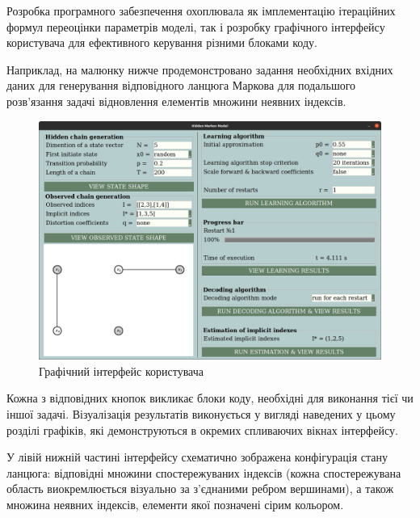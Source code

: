 \label{appendix: A}

Розробка програмного забезпечення охоплювала як імплементацію ітераційних формул переоцінки параметрів моделі, так і розробку графічного інтерфейсу користувача для ефективного керування різними блоками коду. 

Наприклад, на малюнку нижче продемонстровано задання необхідних вхідних даних для генерування відповідного ланцюга Маркова для подальшого розв'язання задачі відновлення елементів множини неявних індексів.

\begin{figure}[H]\centering
    \includegraphics[width=1\linewidth]{Images/GUI.png}
    \caption{Графічний інтерфейс користувача}
    \label{pic: GUI}
\end{figure}

Кожна з відповідних кнопок викликає блоки коду, необхідні для виконання тієї чи іншої задачі. Візуалізація результатів виконується у вигляді наведених у цьому розділі графіків, які демонструються в окремих спливаючих вікнах інтерфейсу.

У лівій нижній частині інтерфейсу схематично зображена конфігурація стану ланцюга: відповідні множини спостережуваних індексів (кожна спостережувана область виокремлюється візуально за з'єднаними ребром вершинами), а також множина неявних індексів, елементи якої позначені сірим кольором.